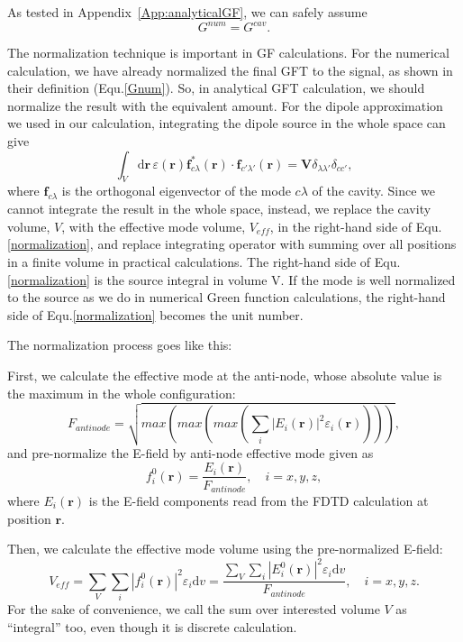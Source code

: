 As tested in Appendix~\ref{App:analyticalGF}, we can safely assume
\begin{equation}
 G^{num}=G^{cav}.
\end{equation}


The normalization technique is important in GF calculations. For the numerical calculation, we have already normalized the final GFT to the signal, as shown in their definition (Equ.\eqref{Gnum}). So, in analytical GFT calculation, we should normalize the result with the equivalent amount. For the dipole approximation we used in our calculation, integrating the dipole source in the whole space can give
\begin{equation}
 \int_V \! \mathrm{d}\mathbf{r} \, \varepsilon(\mathbf{r})\mathbf{f}_{c\lambda}^*(\mathbf{r}) \cdot \mathbf{f}_{c'\lambda'}(\mathbf{r})=\mathbf{V}\delta_{\lambda\lambda'}\delta_{cc'},
\label{normalization}
\end{equation}
where $\mathbf{f}_{c\lambda}$ is the orthogonal eigenvector of the mode $c\lambda$ of the cavity. Since we cannot integrate the result in the whole space, instead, we replace the cavity volume, $V$, with the effective mode volume, $V_{eff}$, in the right-hand side of Equ.\eqref{normalization}, and replace integrating operator with summing over all positions in a finite volume in practical calculations. The right-hand side of Equ.\eqref{normalization} is the source integral in volume V. If the mode is well normalized to the source as we do in numerical Green function calculations, the right-hand side of Equ.\eqref{normalization} becomes the unit number.

The normalization process goes like this:

First, we calculate the effective mode at the anti-node, whose absolute value is the maximum in the whole configuration:
\begin{equation}
 F_{antinode}=\sqrt{max(max(max(\sum_i{|E_i(\mathbf{r})|^2\varepsilon_i(\mathbf{r})})))},
\end{equation}
and pre-normalize the E-field by anti-node effective mode given as
\begin{equation}
 f_i^0(\mathbf{r})=\frac{E_i(\mathbf{r})}{F_{antinode}}, \quad i=x,y,z,
\label{fi}
\end{equation}
where $E_i(\mathbf{r})$ is the E-field components read from the FDTD calculation at position $\mathbf{r}$.

Then, we calculate the effective mode volume using the pre-normalized E-field:
\begin{equation}
 V_{e \! f\!\! f}= \sum_V{\sum_i{|f_i^0(\mathbf{r})|^2\varepsilon_i}}\mathrm{d}v=\frac{\sum_V{\sum_i{|E_i^0(\mathbf{r})|^2\varepsilon_i}}\mathrm{d}v}{F_{antinode}}, \quad i=x,y,z.
\label{Veff}
\end{equation}
For the sake of convenience, we call the sum over interested volume $V$ as ``integral'' too, even though it is discrete calculation.

